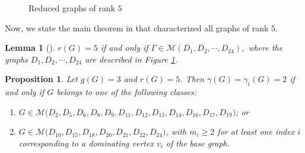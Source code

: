 \documentclass[12pt]{amsart}
\theoremstyle{plain}
\newtheorem{lemma}[theorem]{Lemma}
\newtheorem{proposition}[theorem]{Proposition}
\theoremstyle{definition}
\begin{document}
\begin{figure}
		\caption{Reduced graphs of rank $5$}
		\label{fig:rank 5 graphs}	
	\end{figure}
	Now, we state the main theorem in \cite{LAA-rank-5-graph-charecterization} that characterized all graphs of rank $5.$
	\begin{lemma}[\cite{LAA-rank-5-graph-charecterization}]\label{lemma: cha of graphs of rank 5}
	$r(G)=5$ if and only if $\Gamma\in\mathcal{M}(D_1, D_2, \cdots, D_{24}),$ where the graphs $D_1, D_2, \cdots, D_{24}$ are described in Figure \ref{fig:rank 5 graphs}.
	\end{lemma}




\begin{proposition}\label{prop:rank-5-d-td=2}
Let $g(G)=3$ and $r(G)=5$. Then $\gamma(G)=\gamma_t(G)=2$ if and only if $G$ belongs to one of the following classes:
\begin{enumerate}
\item $G\in\mathcal{M}\bigl(D_2,D_5,D_6,D_8,D_9,D_{11},D_{12},D_{13},D_{14},D_{16},D_{17},D_{19}\bigr)$; or
\item $G\in\mathcal{M}\bigl(D_{10},D_{15},D_{18},D_{20},D_{21},D_{22},D_{24}\bigr)$, with $m_i\geq 2$ for at least one index $i$ corresponding to a dominating vertex $v_i$ of the base graph.
\end{enumerate}
\end{proposition}
\end{document}
